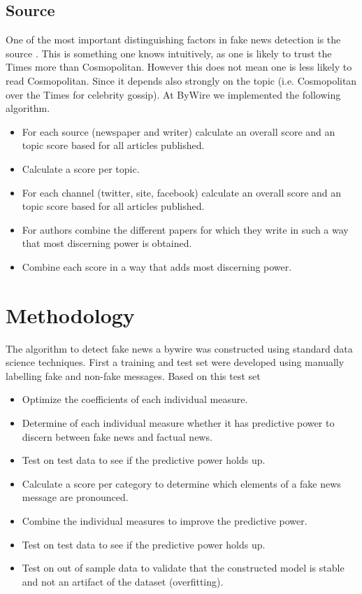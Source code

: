 \documentclass[10pt, a4paper, twocolumn]{article} %
\begin{document}
\subsection{Source}
One of the most important distinguishing factors in fake news detection is the source \cite{sitaula2019}. This is something one knows intuitively, as one is likely to trust the Times more than Cosmopolitan. However this does not mean one is less likely to read Cosmopolitan. Since it depends also strongly on the topic (i.e. Cosmopolitan over the Times for celebrity gossip). At ByWire we implemented the following algorithm.
\begin{itemize}
\item For each source (newspaper and writer) calculate an overall score and an topic score based for all articles published.
\item Calculate a score per topic.
\item For each channel (twitter, site, facebook) calculate an overall score and an topic score based for all articles published.
\item For authors combine the different papers for which they write in such a way that most discerning power is obtained.
\item Combine each score in a way that adds most discerning power.
\end{itemize}


\section{Methodology}
The algorithm to detect fake news a bywire was constructed using standard data science techniques. First a training and test set were developed using manually labelling fake and non-fake messages. Based on this test set 
\begin{itemize}
\item Optimize the coefficients of each individual measure.
\item Determine of each individual measure whether it has predictive power to discern between fake news and factual news.
\item Test on test data to see if the predictive power holds up.
\item Calculate a score per category to determine which elements of a fake news message are pronounced.
\item Combine the individual measures to improve the predictive power.
\item Test on test data to see if the predictive power holds up.
\item Test on out of sample data to validate that the constructed model is stable and not an artifact of the dataset (overfitting).
\end{itemize}
\end{document}
